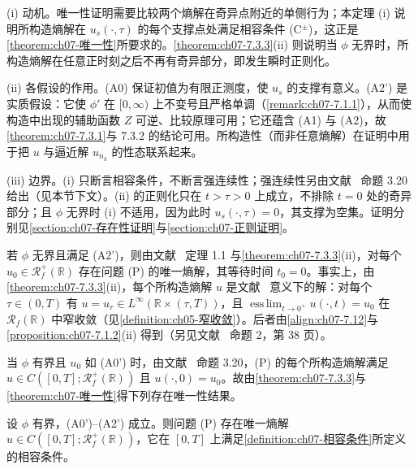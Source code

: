 \documentclass[../../main.tex]{subfiles}%
\begin{document}
\begin{remark}\label{remark:ch07-7.3.3动机}
(i) 动机。唯一性证明需要比较两个熵解在奇异点附近的单侧行为；本定理 (i) 说明所构造熵解在 $u_s(\cdot,\tau)$ 的每个支撑点处满足相容条件 (C$^\pm$)，这正是\cref{theorem:ch07-唯一性}所要求的。\cref{theorem:ch07-7.3.3}(ii) 则说明当 $\phi$ 无界时，所构造熵解在任意正时刻之后不再有奇异部分，即发生瞬时正则化。

(ii) 各假设的作用。(A0) 保证初值为有限正测度，使 $u_s$ 的支撑有意义。(A2') 是实质假设：它使 $\phi'$ 在 $[0,\infty)$ 上不变号且严格单调（\cref{remark:ch07-7.1.1}），从而使构造中出现的辅助函数 $Z$ 可逆、比较原理可用；它还蕴含 (A1) 与 (A2)，故\cref{theorem:ch07-7.3.1}与 7.3.2 的结论可用。所构造性（而非任意熵解）在证明中用于把 $u$ 与逼近解 $u_{n_k}$ 的性态联系起来。

(iii) 边界。(i) 只断言相容条件，不断言强连续性；强连续性另由文献~\cite{ref17} 命题 3.20 给出（见本节下文）。(ii) 的正则化只在 $t>\tau>0$ 上成立，不排除 $t=0$ 处的奇异部分；且 $\phi$ 无界时 (i) 不适用，因为此时 $u_s(\cdot,\tau)=0$，其支撑为空集。证明分别见\cref{section:ch07-存在性证明}与\cref{section:ch07-正则证明}。
\end{remark}

\begin{remark}\label{remark:ch07-7.3.1}
若 $\phi$ 无界且满足 (A2')，则由文献~\cite{ref67} 定理 1.1 与\cref{theorem:ch07-7.3.3}(ii)，对每个 $u_0\in\mathscr{R}_f^+(\mathbb{R})$ 存在问题 (P) 的唯一熵解，其等待时间 $t_0=0$。事实上，由\cref{theorem:ch07-7.3.3}(ii)，每个所构造熵解 $u$ 是文献~\cite{ref67} 意义下的解：对每个 $\tau\in(0,T)$ 有 $u=u_r\in L^\infty(\mathbb{R}\times(\tau,T))$，且 $\operatorname*{ess\,lim}_{t\to0^+}u(\cdot,t)=u_0$ 在 $\mathscr{R}_f(\mathbb{R})$ 中窄收敛（见\cref{definition:ch05-窄收敛}）。后者由\eqref{align:ch07-7.12}与\cref{proposition:ch07-7.1.2}(ii) 得到（另见文献~\cite{ref53} 命题 2，第 38 页）。

当 $\phi$ 有界且 $u_0$ 如 (A0') 时，由文献~\cite{ref17} 命题 3.20，(P) 的每个所构造熵解满足 $u\in C([0,T];\mathscr{R}_f^+(\mathbb{R}))$ 且 $u(\cdot,0)=u_0$。故由\cref{theorem:ch07-7.3.3}与\cref{theorem:ch07-唯一性}得下列存在唯一性结果。
\end{remark}

\begin{theorem}\label{theorem:ch07-存在唯一}
设 $\phi$ 有界，(A0')--(A2') 成立。则问题 (P) 存在唯一熵解 $u\in C([0,T];\mathscr{R}_f^+(\mathbb{R}))$，它在 $[0,T]$ 上满足\cref{definition:ch07-相容条件}所定义的相容条件。
\end{theorem}
\end{document}
